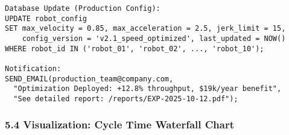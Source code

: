 \documentclass[
]{article}
\begin{document}
\begin{verbatim}
Database Update (Production Config):
UPDATE robot_config
SET max_velocity = 0.85, max_acceleration = 2.5, jerk_limit = 15,
    config_version = 'v2.1_speed_optimized', last_updated = NOW()
WHERE robot_id IN ('robot_01', 'robot_02', ..., 'robot_10');

Notification:
SEND_EMAIL(production_team@company.com,
  "Optimization Deployed: +12.8% throughput, $19k/year benefit",
  "See detailed report: /reports/EXP-2025-10-12.pdf");
\end{verbatim}

\hypertarget{visualization-cycle-time-waterfall-chart}{%
\subsubsection{5.4 Visualization: Cycle Time Waterfall
Chart}\label{visualization-cycle-time-waterfall-chart}}
\end{document}
